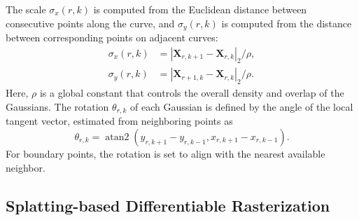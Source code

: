 The scale $\sigma_x(r,k)$ is computed from the Euclidean distance between consecutive points along the curve, and $\sigma_y(r,k)$ is computed from the distance between corresponding points on adjacent curves:
\begin{equation} \label{eq:sigma}
\begin{aligned}
\sigma_x(r,k) &= | \mathbf{X}_{r,k+1} - \mathbf{X}_{r,k} |_2 / \rho, \\
\sigma_y(r,k) &= | \mathbf{X}_{r+1,k} - \mathbf{X}_{r,k} |_2 / \rho.
\end{aligned}
\end{equation}
Here, $\rho$ is a global constant that controls the overall density and overlap of the Gaussians.
The rotation $\theta_{r,k}$ of each Gaussian is defined by the angle of the local tangent vector, estimated from neighboring points as
\begin{equation} \label{eq:rotation}
\theta_{r,k} = \operatorname{atan2}\left( y_{r,k+1} - y_{r,k-1}, x_{r,k+1} - x_{r,k-1} \right).
\end{equation}
For boundary points, the rotation is set to align with the nearest available neighbor.




\vspace{-.5em}
\subsection{Splatting-based Differentiable Rasterization}
\vspace{-.5em}

